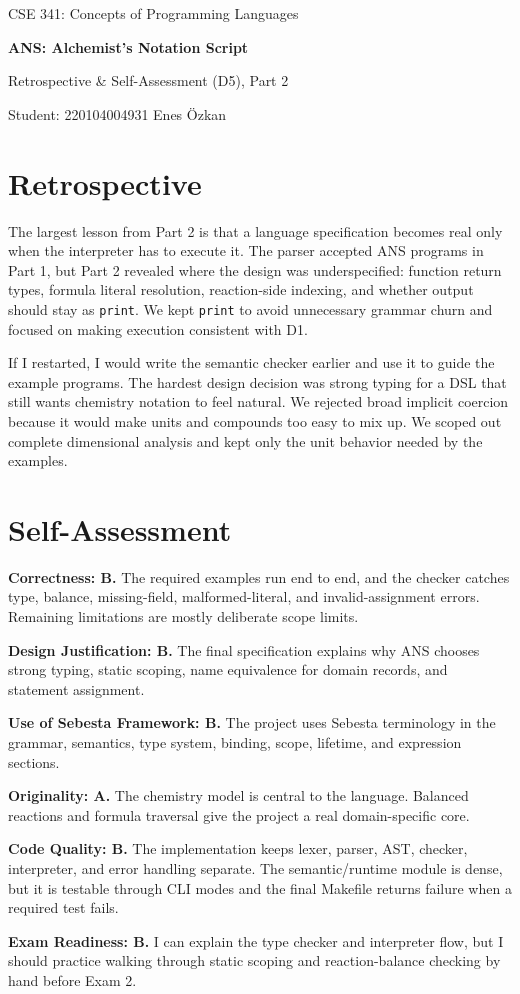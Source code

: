 \documentclass[11pt,a4paper]{article}
\newcommand{\code}[1]{\texttt{#1}}
\begin{document}
\begin{center}
{\footnotesize\color{anscaption}CSE 341: Concepts of Programming Languages\par}
{\huge\bfseries ANS: Alchemist's Notation Script\par}
{\large Retrospective \& Self-Assessment (D5), Part 2\par}
{\footnotesize\color{anscaption}Student: 220104004931 Enes Özkan}
\end{center}

\section*{Retrospective}
The largest lesson from Part 2 is that a language specification becomes real only when the interpreter has to execute it. The parser accepted ANS programs in Part 1, but Part 2 revealed where the design was underspecified: function return types, formula literal resolution, reaction-side indexing, and whether output should stay as \code{print}. We kept \code{print} to avoid unnecessary grammar churn and focused on making execution consistent with D1.

If I restarted, I would write the semantic checker earlier and use it to guide the example programs. The hardest design decision was strong typing for a DSL that still wants chemistry notation to feel natural. We rejected broad implicit coercion because it would make units and compounds too easy to mix up. We scoped out complete dimensional analysis and kept only the unit behavior needed by the examples.

\section*{Self-Assessment}
\textbf{Correctness: B.} The required examples run end to end, and the checker catches type, balance, missing-field, malformed-literal, and invalid-assignment errors. Remaining limitations are mostly deliberate scope limits.

\textbf{Design Justification: B.} The final specification explains why ANS chooses strong typing, static scoping, name equivalence for domain records, and statement assignment.

\textbf{Use of Sebesta Framework: B.} The project uses Sebesta terminology in the grammar, semantics, type system, binding, scope, lifetime, and expression sections.

\textbf{Originality: A.} The chemistry model is central to the language. Balanced reactions and formula traversal give the project a real domain-specific core.

\textbf{Code Quality: B.} The implementation keeps lexer, parser, AST, checker, interpreter, and error handling separate. The semantic/runtime module is dense, but it is testable through CLI modes and the final Makefile returns failure when a required test fails.

\textbf{Exam Readiness: B.} I can explain the type checker and interpreter flow, but I should practice walking through static scoping and reaction-balance checking by hand before Exam 2.
\end{document}
